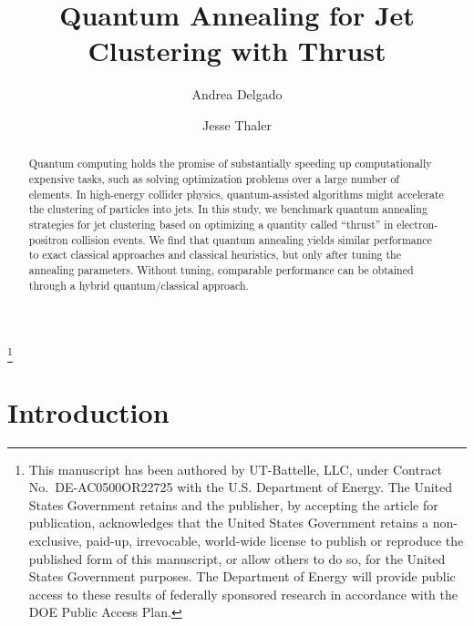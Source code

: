 \documentclass[aps,prd,twocolumn,superscriptaddress,preprintnumbers,nofootinbib,longbibliography,floatfix]{revtex4-1}
\begin{document}
%
%


\title{Quantum Annealing for Jet Clustering with Thrust}
\thanks{This manuscript has been authored by UT-Battelle, LLC, under Contract No.~DE-AC0500OR22725 with the U.S. Department of Energy. The United States Government retains and the publisher, by accepting the article for publication, acknowledges that the United States Government retains a non-exclusive, paid-up, irrevocable, world-wide license to publish or reproduce the published form of this manuscript, or allow others to do so, for the United States Government purposes. The Department of Energy will provide public access to these results of federally sponsored research in accordance with the DOE Public Access Plan.}%


\author{Andrea Delgado}

\author{Jesse Thaler}

\begin{abstract}
%
Quantum computing holds the promise of substantially speeding up computationally expensive tasks, such as solving optimization problems over a large number of elements.
%
In high-energy collider physics, quantum-assisted algorithms might accelerate the clustering of particles into jets.
%
In this study, we benchmark quantum annealing strategies for jet clustering based on optimizing a quantity called ``thrust'' in electron-positron collision events.
%
We find that quantum annealing yields similar performance to exact classical approaches and classical heuristics, but only after tuning the annealing parameters. 
%
Without tuning, comparable performance can be obtained through a hybrid quantum/classical approach.
%
\end{abstract}

\maketitle


{\tableofcontents}


%
%

\section{Introduction}
\label{sec:intro}
\end{document}
